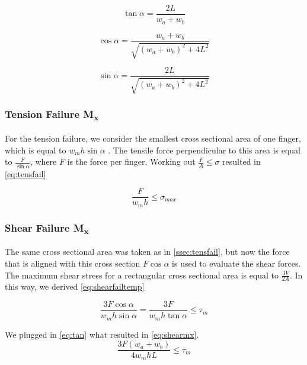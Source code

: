\begin{equation}
	\label{eq:tan}
	\tan \alpha = \frac{2L}{w_a + w_b}
\end{equation}

\begin{equation}
	\label{eq:cos}
	\cos \alpha = \frac{w_a + w_b}{\sqrt{ \left( w_a + w_b \right) ^2 + 4L ^2 }}
\end{equation}

\begin{equation}
	\label{eq:sin}
	\sin \alpha = \frac{2L}{\sqrt{ \left( w_a + w_b \right) ^2 + 4L ^2 }}
\end{equation}


\subsubsection{Tension Failure M\textsubscript{x}}\label{ssec:tensfail}
For the tension failure, we consider the smallest cross sectional area of one finger, which is equal to $w_m h \sin \alpha$ . The tensile force perpendicular to this area is equal to $\frac{F}{\sin \alpha}$, where $F$ is the force per finger. %
Working out $\frac{F}{A} \le \sigma$ resulted in \autoref{eq:tensfail}


\begin{equation}
		\label{eq:tensfail}
	\frac{F}{w_m  h} \le \sigma_{max}
\end{equation}


\subsubsection{Shear Failure M\textsubscript{x}}
The same cross sectional area was taken as in \autoref{ssec:tensfail}, but now the force that is aligned with this cross section $F \cos \alpha$ is used to evaluate the shear forces. The maximum shear stress for a rectangular cross sectional area is equal to $\frac{3V}{2A}$. In this way, we derived \autoref{eq:shearfailtemp}

\begin{equation}
	\label{eq:shearfailtemp}
	\frac{3F \cos \alpha}{w_m h \sin \alpha} = \frac{3F }{w_m h \tan \alpha} \le \tau_m
\end{equation}

We plugged in \autoref{eq:tan} what resulted in \autoref{eq:shearmx}.
\begin{equation}
	\label{eq:shearmx}
	\frac{ 3 F \left(w_a + w_b \right) }{ 4  w_m h L} \le \tau_m	
\end{equation}

